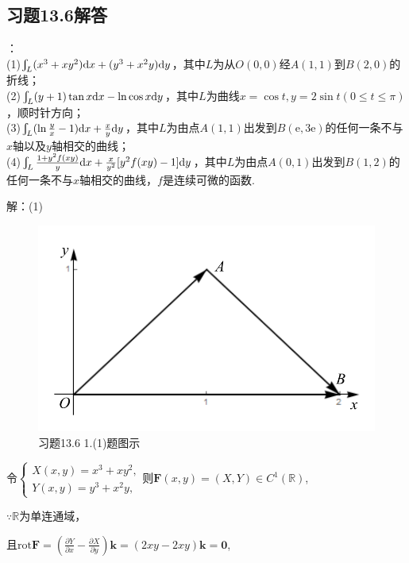 \documentclass[12pt,UTF8]{ctexart}
\newcommand{\BLInt}[2]{\varint\nolimits_{#1}#2}
\newcommand{\md}[1]{\mathrm d#1}
\newcommand{\pp}[2]{\frac{\partial #1}{\partial #2}}
\newcommand{\me}[0]{\mathrm e}
\begin{document}
\subsection{习题13.6解答}
\begin{enumerate}
：\\
(1)$\BLInt L{(x^3+xy^2)\md x+(y^3+x^2y)\md y}$，其中$L$为从$O(0,0)$经$A(1,1)$到$B(2,0)$的折线；\\
(2)$\BLInt L{(y+1)\tan x\md x-\ln\cos x\md y}$，其中$L$为曲线$x=\cos t,y=2\sin t(0\leqslant t\leqslant\pi)$，顺时针方向；\\
(3)$\BLInt L{(\ln\frac yx-1)\md x+\frac xy\md y}$，其中$L$为由点$A(1,1)$出发到$B(\me,3\me)$的任何一条不与$x$轴以及$y$轴相交的曲线；\\
(4)$\BLInt L{\frac{1+y^2f(xy)}y\md x+\frac x{y^2}[y^2f(xy)-1]\md y}$，其中$L$为由点$A(0,1)$出发到$B(1,2)$的任何一条不与$x$轴相交的曲线，$f$是连续可微的函数.

解：(1)\begin{figure}[H]
\begin{center}
\includegraphics[height=0.2\textheight]{Figures25/Fig13-6-1-1.pdf}
\end{center}
\caption{习题13.6 1.(1)题图示}
\label{13-6-1-1}
\end{figure}

令$\begin{cases}
X(x,y)=x^3+xy^2,\\
Y(x,y)=y^3+x^2y,
\end{cases}$则$\bm F(x,y)=(X,Y)\in C^1(\mathbb R)$, 

$\because\mathbb R$为单连通域，

且$\text{rot}\bm F=(\pp Yx-\pp Xy)\bm k=(2xy-2xy)\bm k=\bm0$,


\end{enumerate}
\end{document}
